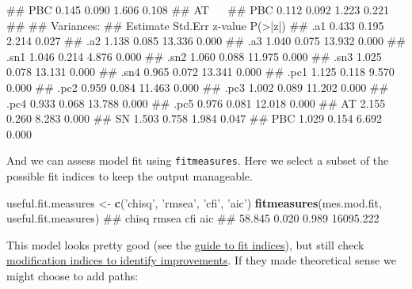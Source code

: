\documentclass[]{article}
\newenvironment{Shaded}{\begin{snugshade}}{\end{snugshade}}
\newcommand{\KeywordTok}[1]{\textcolor[rgb]{0.13,0.29,0.53}{\textbf{#1}}}
\newcommand{\StringTok}[1]{\textcolor[rgb]{0.31,0.60,0.02}{#1}}
\newcommand{\NormalTok}[1]{#1}
\theoremstyle{definition}
\theoremstyle{definition}
\theoremstyle{definition}
\theoremstyle{remark}
\begin{document}
\begin{Shaded}
\begin{Highlighting}[]
\NormalTok{##     PBC               0.145    0.090    1.606    0.108}
\NormalTok{##   AT ~~                                               }
\NormalTok{##     PBC               0.112    0.092    1.223    0.221}
\NormalTok{## }
\NormalTok{## Variances:}
\NormalTok{##                    Estimate  Std.Err  z-value  P(>|z|)}
\NormalTok{##    .a1                0.433    0.195    2.214    0.027}
\NormalTok{##    .a2                1.138    0.085   13.336    0.000}
\NormalTok{##    .a3                1.040    0.075   13.932    0.000}
\NormalTok{##    .sn1               1.046    0.214    4.876    0.000}
\NormalTok{##    .sn2               1.060    0.088   11.975    0.000}
\NormalTok{##    .sn3               1.025    0.078   13.131    0.000}
\NormalTok{##    .sn4               0.965    0.072   13.341    0.000}
\NormalTok{##    .pc1               1.125    0.118    9.570    0.000}
\NormalTok{##    .pc2               0.959    0.084   11.463    0.000}
\NormalTok{##    .pc3               1.002    0.089   11.202    0.000}
\NormalTok{##    .pc4               0.933    0.068   13.788    0.000}
\NormalTok{##    .pc5               0.976    0.081   12.018    0.000}
\NormalTok{##     AT                2.155    0.260    8.283    0.000}
\NormalTok{##     SN                1.503    0.758    1.984    0.047}
\NormalTok{##     PBC               1.029    0.154    6.692    0.000}
\end{Highlighting}
\end{Shaded}

And we can assess model fit using \texttt{fitmeasures}. Here we select a
subset of the possible fit indices to keep the output manageable.

\begin{Shaded}
\begin{Highlighting}[]
\NormalTok{useful.fit.measures <-}\StringTok{ }\KeywordTok{c}\NormalTok{(}\StringTok{'chisq'}\NormalTok{, }\StringTok{'rmsea'}\NormalTok{, }\StringTok{'cfi'}\NormalTok{, }\StringTok{'aic'}\NormalTok{)}
\KeywordTok{fitmeasures}\NormalTok{(mes.mod.fit, useful.fit.measures)}
\NormalTok{##     chisq     rmsea       cfi       aic }
\NormalTok{##    58.845     0.020     0.989 16095.222}
\end{Highlighting}
\end{Shaded}

This model looks pretty good (see the
\protect\hyperlink{common-fit-indices}{guide to fit indices}), but still
check \protect\hyperlink{model-improvement}{modification indices to
identify improvements}. If they made theoretical sense we might choose
to add paths:
\end{document}

